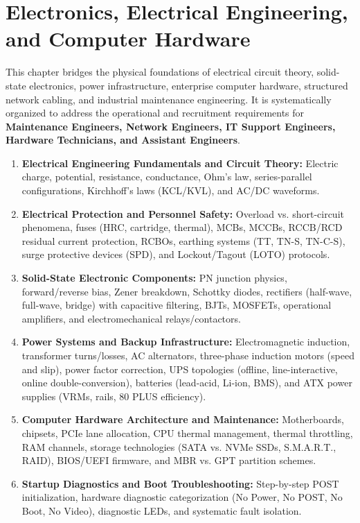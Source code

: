 \chapter{Electronics, Electrical Engineering, and Computer Hardware}
\label{ch:electronics_electrical_hardware}

This chapter bridges the physical foundations of electrical circuit theory, solid-state electronics, power infrastructure, enterprise computer hardware, structured network cabling, and industrial maintenance engineering. It is systematically organized to address the operational and recruitment requirements for \textbf{Maintenance Engineers, Network Engineers, IT Support Engineers, Hardware Technicians, and Assistant Engineers}.

\begin{enumerate}[label=\bfseries\arabic*.]
    \item \textbf{Electrical Engineering Fundamentals and Circuit Theory:} Electric charge, potential, resistance, conductance, Ohm's law, series-parallel configurations, Kirchhoff's laws (KCL/KVL), and AC/DC waveforms.
    \item \textbf{Electrical Protection and Personnel Safety:} Overload vs. short-circuit phenomena, fuses (HRC, cartridge, thermal), MCBs, MCCBs, RCCB/RCD residual current protection, RCBOs, earthing systems (TT, TN-S, TN-C-S), surge protective devices (SPD), and Lockout/Tagout (LOTO) protocols.
    \item \textbf{Solid-State Electronic Components:} PN junction physics, forward/reverse bias, Zener breakdown, Schottky diodes, rectifiers (half-wave, full-wave, bridge) with capacitive filtering, BJTs, MOSFETs, operational amplifiers, and electromechanical relays/contactors.
    \item \textbf{Power Systems and Backup Infrastructure:} Electromagnetic induction, transformer turns/losses, AC alternators, three-phase induction motors (speed and slip), power factor correction, UPS topologies (offline, line-interactive, online double-conversion), batteries (lead-acid, Li-ion, BMS), and ATX power supplies (VRMs, rails, 80 PLUS efficiency).
    \item \textbf{Computer Hardware Architecture and Maintenance:} Motherboards, chipsets, PCIe lane allocation, CPU thermal management, thermal throttling, RAM channels, storage technologies (SATA vs. NVMe SSDs, S.M.A.R.T., RAID), BIOS/UEFI firmware, and MBR vs. GPT partition schemes.
    \item \textbf{Startup Diagnostics and Boot Troubleshooting:} Step-by-step POST initialization, hardware diagnostic categorization (No Power, No POST, No Boot, No Video), diagnostic LEDs, and systematic fault isolation.

\end{enumerate}
